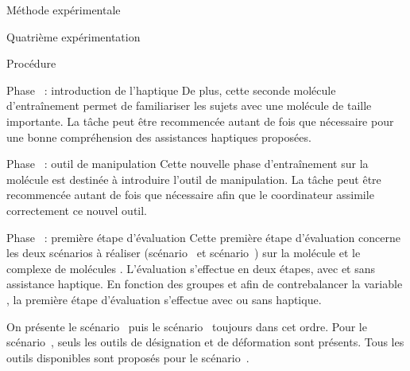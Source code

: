 \documentclass[myfrancais,ngerman,english,frenchb]{mythesis}
\begin{document}
\begin{mychapter}{Méthode expérimentale}
\begin{mysection}{Quatrième expérimentation}
\begin{mysubsection}{Procédure}
\begin{myparagraph}{Phase~ : introduction de l'haptique}
					De plus, cette seconde molécule d'entraînement permet de familiariser les sujets avec une molécule de taille importante.
					La tâche peut être recommencée autant de fois que nécessaire pour une bonne compréhension des assistances haptiques proposées.
				\end{myparagraph}
				\begin{myparagraph}{Phase~ : outil de manipulation}
					Cette nouvelle phase d'entraînement sur la molécule \myTRPZIPPER est destinée à introduire l'outil de manipulation.
					La tâche peut être recommencée autant de fois que nécessaire afin que le coordinateur assimile correctement ce nouvel outil.
				\end{myparagraph}
				\begin{myparagraph}{Phase~ : première étape d'évaluation}
					Cette première étape d'évaluation concerne les deux scénarios à réaliser (scénario~ et scénario~) sur la molécule \myUbiquitin et le complexe de molécules \myNusENusG.
					L'évaluation s'effectue en deux étapes, avec et sans assistance haptique.
					En fonction des groupes et afin de contrebalancer la variable , la première étape d'évaluation s'effectue avec ou sans haptique.

					On présente le scénario~ puis le scénario~ toujours dans cet ordre.
					Pour le scénario~, seuls les outils de désignation et de déformation sont présents.
					Tous les outils disponibles sont proposés pour le scénario~.


\end{myparagraph}
\end{mysubsection}
\end{mysection}
\end{mychapter}
\end{document}
